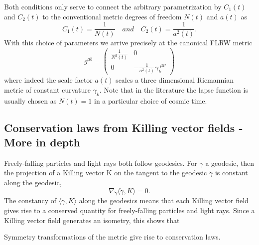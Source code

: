 Both conditions only serve to connect the arbitrary parametrization by $C_1(t)$ and $C_2(t)$ to
the conventional metric degrees of freedom $N(t)$ and $a(t)$ as
\begin{equation}
	C_1(t) = \frac{1}{N(t)} \quad and \quad C_2(t)=\frac{1}{a^2(t)}.
\end{equation}
With this choice of parameters we arrive precisely at the canonical FLRW metric
\begin{equation}
g^{ab} =
\begin{pmatrix}
\frac{1}{N^2(t)}&0\\
0& - \frac{1}{a^2(t)} \gamma^{\,\, \mu \nu}_k
\end{pmatrix}
\end{equation}
where indeed the scale factor $a(t)$ scales a three dimensional Riemannian metric of constant curvature $γ_k$. Note that in the literature the lapse function is usually chosen as $N(t) = 1$
in a particular choice of cosmic time.

\subsection{Conservation laws from Killing vector fields - More in depth}
Freely-falling particles and light rays both follow geodesics. For $\gamma$ a geodesic, then the projection of a Killing vector K on the tangent to the geodesic $\dot{\gamma}$ is constant along the geodesic,
\begin{equation}
\nabla_{\dot{\gamma}} \langle \dot{\gamma},K\rangle = 0.
\end{equation}
The constancy of $\langle \dot{\gamma},K\rangle$ along the geodesics means that each Killing vector field gives rise to a conserved quantity for freely-falling particles and light rays. Since a Killing vector field generates an isometry, this shows that 
\begin{statements}
	Symmetry transformations of the metric give rise to conservation laws.
\end{statements}


